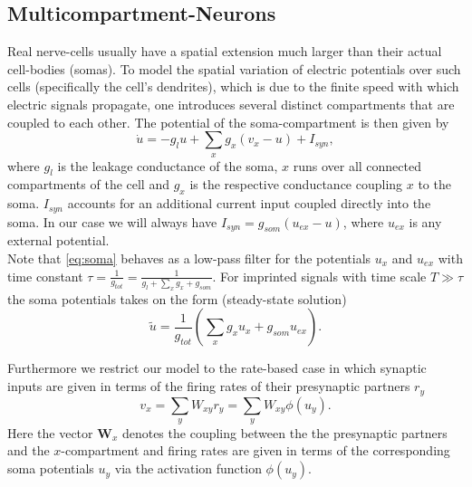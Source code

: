 \documentclass[12pt,a4paper]{article}
\begin{document}
\subsection{Multicompartment-Neurons}
Real nerve-cells usually have a spatial extension much larger than their actual cell-bodies (somas). To model the spatial variation of electric potentials over such cells (specifically the cell's dendrites), which is due to the finite speed with which electric signals propagate, one introduces several distinct compartments that are coupled to each other. The potential of the soma-compartment is then given by
\begin{equation}
\dot{u} = -g_lu + \sum_xg_x(v_x-u) + I_{syn}, \label{eq:soma}
\end{equation}  
where $g_l$ is the leakage conductance of the soma, $x$ runs over all connected compartments of the cell and $g_x$ is the respective conductance coupling $x$ to the soma. $I_{syn}$ accounts for an additional current input coupled directly into the soma. In our case we will always have $I_{syn} = g_{som}(u_{ex}-u)$, where $u_{ex}$ is any external potential.\\
Note that \eqref{eq:soma} behaves as a low-pass filter for the potentials $u_x$ and $u_{ex}$ with time constant $\tau = \frac{1}{g_{tot}} = \frac{1}{g_l + \sum_x g_x + g_{som}}$. For imprinted signals with time scale $T\gg\tau$ the soma potentials takes on the form (steady-state solution)
\begin{equation}
\tilde{u} = \frac{1}{g_{tot}}\left(\sum_x g_xu_x + g_{som}u_{ex}\right). \label{eq:steady}
\end{equation}

Furthermore we restrict our model to the rate-based case in which synaptic inputs are given in terms of the firing rates of their presynaptic partners $r_y$
\begin{equation}
v_x = \sum_yW_{xy}r_y = \sum_yW_{xy}\phi(u_y).
\end{equation}
Here the vector $\bm{W}_x$ denotes the coupling between the the presynaptic partners and the $x$-compartment and firing rates are given in terms of the corresponding soma potentials $u_y$ via the activation function $\phi(u_y)$.
\end{document}
